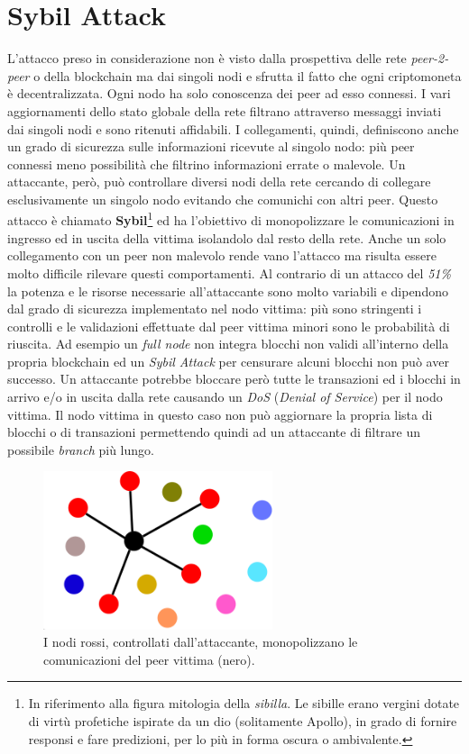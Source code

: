 \section{Sybil Attack}
L'attacco preso in considerazione non è visto dalla prospettiva delle rete \textit{peer-2-peer} o della blockchain ma dai singoli nodi e sfrutta il fatto che ogni criptomoneta è decentralizzata. Ogni nodo ha solo conoscenza dei peer ad esso connessi. I vari aggiornamenti dello stato globale della rete filtrano attraverso messaggi inviati dai singoli nodi e sono ritenuti affidabili.\newline
I collegamenti, quindi, definiscono anche un grado di sicurezza sulle informazioni ricevute al singolo nodo: più peer connessi meno possibilità che filtrino informazioni errate o malevole. Un attaccante, però, può controllare diversi nodi della rete cercando di collegare esclusivamente un singolo nodo evitando che comunichi con altri peer. Questo attacco è chiamato \textbf{Sybil}\footnote{In riferimento alla figura mitologia della \textit{sibilla}. Le sibille erano vergini dotate di virtù profetiche ispirate da un dio (solitamente Apollo), in grado di fornire responsi e fare predizioni, per lo più in forma oscura o ambivalente.} ed ha l'obiettivo di monopolizzare le comunicazioni in ingresso ed in uscita della vittima isolandolo dal resto della rete. Anche un solo collegamento con un peer non malevolo rende vano l'attacco ma risulta essere molto difficile rilevare questi comportamenti.\newline
Al contrario di un attacco del \textit{51\%} la potenza e le risorse necessarie all'attaccante sono molto variabili e dipendono dal grado di sicurezza implementato nel nodo vittima: più sono stringenti i controlli e le validazioni effettuate dal peer vittima minori sono le probabilità di riuscita. Ad esempio un \textit{full node} non integra blocchi non validi all'interno della propria blockchain ed un \textit{Sybil Attack} per censurare alcuni blocchi non può aver successo. Un attaccante potrebbe bloccare però tutte le transazioni ed i blocchi in arrivo e/o in uscita dalla rete causando un \textit{DoS} (\textit{Denial of Service}) per il nodo vittima. Il nodo vittima in questo caso non può aggiornare la propria lista di blocchi o di transazioni permettendo quindi ad un attaccante di filtrare un possibile \textit{branch} più lungo.\newline
\begin{figure}
    \centering
    \includegraphics[width=0.6\textwidth]{images/sybil.png}
    \caption{I nodi rossi, controllati dall'attaccante, monopolizzano le comunicazioni del peer vittima (nero). \cite{owning}}
\end{figure}
